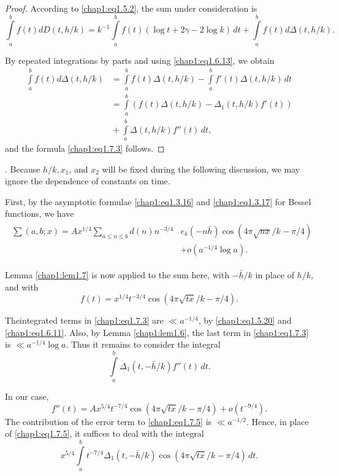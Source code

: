 \begin{proof}
According to \eqref{chap1:eq1.5.2}, the sum under consideration is 
$$
\int\limits_a^bf(t)dD(t,h/k)=k^{-1}\int\limits_a^b f(t)(\log
t+2\gamma-2\log k)\,dt+\int\limits_a^bf(t)d\Delta(t,h/k).
$$

By repeated integrations by parts and using \eqref{chap1:eq1.6.13}, we
obtain
\begin{align*}
\int\limits_a^bf(t)d\Delta(t,h/k) &= \int\limits_a^bf(t)\Delta(t,h/k)-
\int\limits_a^b f'(t)\Delta(t,h/k)\,dt\\
&= \int\limits_a^b(f(t)\Delta(t,h/k)-\Delta_1(t,h/k)f'(t))\\
&{} +\int\limits_a^b\Delta(t,h/k)f''(t)\,dt,
\end{align*}
and the formula \eqref{chap1:eq1.7.3} follows.
\end{proof}
\medskip

. Because $h/k,
x_1$, and $x_2$ will be fixed during the following discussion, we may
ignore the dependence of constants on time.

First, by the asymptotic formulae \eqref{chap1:eq1.3.16} and
\eqref{chap1:eq1.3.17} for Bessel functions, we have 
\begin{gather}\label{chap1:eq1.7.4}
\begin{aligned}
\sum(a,b;x)=Ax^{1/4}\sum\limits_{a\leq n\leq b} d(n)n^{-3/4}& e_k
(-n\bar{h})\cos(4\pi\sqrt{nx}/k-\pi/4)\\
&+o(a^{-1/4}\log a).
\end{aligned}
\end{gather}

Lemma \ref{chap1:lem1.7} is now applied to the sum here, with
$-\bar{h}/k$ in place of $h/k$, and with
$$
f(t)=x^{1/4}t^{-3/4}\cos(4\pi\sqrt{tx}/k-\pi/4).
$$

The\pageoriginale integrated terms in \eqref{chap1:eq1.7.3} are $\ll
a^{-1/4}$, by \eqref{chap1:eq1.5.20} and \eqref{chap1:eq1.6.11}. Also, by Lemma
\ref{chap1:lem1.6}, the last term in \eqref{chap1:eq1.7.3} is $\ll
a^{-1/4}\log a$. Thus it remains to consider the integral
\begin{equation}\label{chap1:eq1.7.5}
\int\limits_a^b\Delta_1(t,-\bar{h}/k)f''(t)\,dt.
\end{equation}

In our case,
$$
f''(t)=Ax^{5/4}t^{-7/4}\cos(4\pi\sqrt{tx}/k-\pi/4)+o(t^{-9/4}).
$$
The contribution of the error term to \eqref{chap1:eq1.7.5} is $\ll
a^{-1/2}$. Hence, in place of \eqref{chap1:eq1.7.5}, it suffices to
deal with the integral 
\begin{equation}\label{chap1:eq1.7.6}
x^{5/4}\int\limits_a^bt^{-7/4}\Delta_1(t,-\bar{h}/k)\cos(4\pi\sqrt{tx}/k
-\pi/4)\,dt. 
\end{equation}

